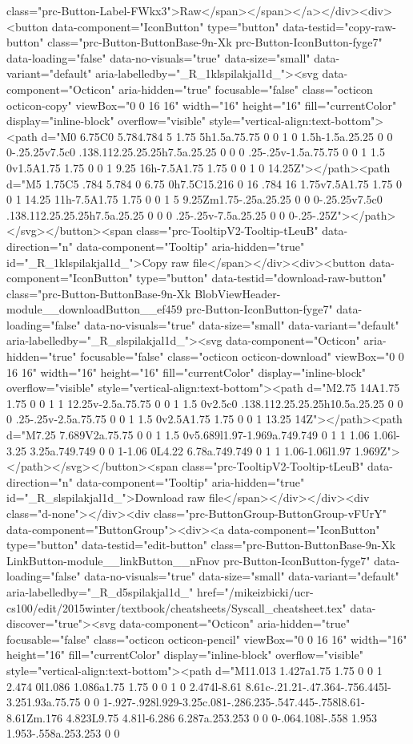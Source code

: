 {{{{{class="prc-Button-Label-FWkx3">Raw</span></span></a></div><div><button data-component="IconButton" type="button" data-testid="copy-raw-button" class="prc-Button-ButtonBase-9n-Xk prc-Button-IconButton-fyge7" data-loading="false" data-no-visuals="true" data-size="small" data-variant="default" aria-labelledby="_R_1klspilakjal1d_"><svg data-component="Octicon" aria-hidden="true" focusable="false" class="octicon octicon-copy" viewBox="0 0 16 16" width="16" height="16" fill="currentColor" display="inline-block" overflow="visible" style="vertical-align:text-bottom"><path d="M0 6.75C0 5.784.784 5 1.75 5h1.5a.75.75 0 0 1 0 1.5h-1.5a.25.25 0 0 0-.25.25v7.5c0 .138.112.25.25.25h7.5a.25.25 0 0 0 .25-.25v-1.5a.75.75 0 0 1 1.5 0v1.5A1.75 1.75 0 0 1 9.25 16h-7.5A1.75 1.75 0 0 1 0 14.25Z"></path><path d="M5 1.75C5 .784 5.784 0 6.75 0h7.5C15.216 0 16 .784 16 1.75v7.5A1.75 1.75 0 0 1 14.25 11h-7.5A1.75 1.75 0 0 1 5 9.25Zm1.75-.25a.25.25 0 0 0-.25.25v7.5c0 .138.112.25.25.25h7.5a.25.25 0 0 0 .25-.25v-7.5a.25.25 0 0 0-.25-.25Z"></path></svg></button><span class="prc-TooltipV2-Tooltip-tLeuB" data-direction="n" data-component="Tooltip" aria-hidden="true" id="_R_1klspilakjal1d_">Copy raw file</span></div><div><button data-component="IconButton" type="button" data-testid="download-raw-button" class="prc-Button-ButtonBase-9n-Xk BlobViewHeader-module__downloadButton__ef459 prc-Button-IconButton-fyge7" data-loading="false" data-no-visuals="true" data-size="small" data-variant="default" aria-labelledby="_R_slspilakjal1d_"><svg data-component="Octicon" aria-hidden="true" focusable="false" class="octicon octicon-download" viewBox="0 0 16 16" width="16" height="16" fill="currentColor" display="inline-block" overflow="visible" style="vertical-align:text-bottom"><path d="M2.75 14A1.75 1.75 0 0 1 1 12.25v-2.5a.75.75 0 0 1 1.5 0v2.5c0 .138.112.25.25.25h10.5a.25.25 0 0 0 .25-.25v-2.5a.75.75 0 0 1 1.5 0v2.5A1.75 1.75 0 0 1 13.25 14Z"></path><path d="M7.25 7.689V2a.75.75 0 0 1 1.5 0v5.689l1.97-1.969a.749.749 0 1 1 1.06 1.06l-3.25 3.25a.749.749 0 0 1-1.06 0L4.22 6.78a.749.749 0 1 1 1.06-1.06l1.97 1.969Z"></path></svg></button><span class="prc-TooltipV2-Tooltip-tLeuB" data-direction="n" data-component="Tooltip" aria-hidden="true" id="_R_slspilakjal1d_">Download raw file</span></div></div><div class="d-none"></div><div class="prc-ButtonGroup-ButtonGroup-vFUrY" data-component="ButtonGroup"><div><a data-component="IconButton" type="button" data-testid="edit-button" class="prc-Button-ButtonBase-9n-Xk LinkButton-module__linkButton__nFnov prc-Button-IconButton-fyge7" data-loading="false" data-no-visuals="true" data-size="small" data-variant="default" aria-labelledby="_R_d5spilakjal1d_" href="/mikeizbicki/ucr-cs100/edit/2015winter/textbook/cheatsheets/Syscall_cheatsheet.tex" data-discover="true"><svg data-component="Octicon" aria-hidden="true" focusable="false" class="octicon octicon-pencil" viewBox="0 0 16 16" width="16" height="16" fill="currentColor" display="inline-block" overflow="visible" style="vertical-align:text-bottom"><path d="M11.013 1.427a1.75 1.75 0 0 1 2.474 0l1.086 1.086a1.75 1.75 0 0 1 0 2.474l-8.61 8.61c-.21.21-.47.364-.756.445l-3.251.93a.75.75 0 0 1-.927-.928l.929-3.25c.081-.286.235-.547.445-.758l8.61-8.61Zm.176 4.823L9.75 4.81l-6.286 6.287a.253.253 0 0 0-.064.108l-.558 1.953 1.953-.558a.253.253 0 0 }}}}}
